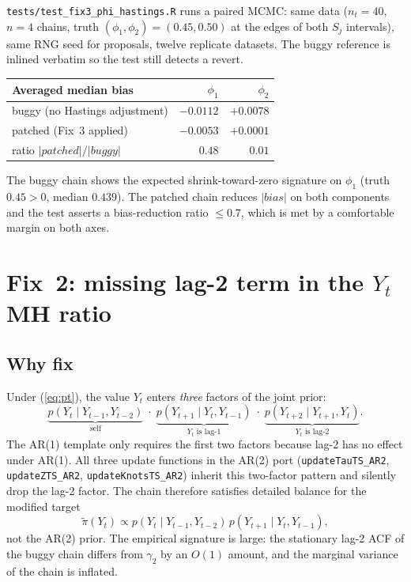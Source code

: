 \documentclass[11pt]{article}
\newcommand{\eref}[1]{(\ref{#1})}
\begin{document}
\texttt{tests/test\_fix3\_phi\_hastings.R} runs a paired MCMC: same data
($n_t = 40$, $n = 4$ chains, truth $(\phi_1, \phi_2) = (0.45, 0.50)$ at the
edges of both $S_j$ intervals), same RNG seed for proposals, twelve replicate
datasets. The buggy reference is inlined verbatim so the test still detects a
revert.
\begin{center}
\begin{tabular}{lrr}
\toprule
\textbf{Averaged median bias}     & $\phi_1$      & $\phi_2$      \\
\midrule
buggy   (no Hastings adjustment)  & $-0.0112$     & $+0.0078$     \\
patched (Fix~3 applied)           & $-0.0053$     & $+0.0001$     \\
ratio   $|patched|/|buggy|$       & $0.48$        & $0.01$        \\
\bottomrule
\end{tabular}
\end{center}
The buggy chain shows the expected shrink-toward-zero signature on $\phi_1$
(truth $0.45 > 0$, median $0.439$). The patched chain reduces $|bias|$ on both
components and the test asserts a bias-reduction ratio $\leq 0.7$, which is
met by a comfortable margin on both axes.

\section{Fix~2: missing lag-2 term in the $Y_t$ MH ratio}\label{ar2fix:fix2}

\subsection{Why fix}

Under \eref{eq:pt}, the value $Y_t$ enters \emph{three} factors of the joint
prior:
\[
  \underbrace{p(Y_t \mid Y_{t-1}, Y_{t-2})}_{\text{self}} \;\cdot\;
  \underbrace{p(Y_{t+1} \mid Y_t, Y_{t-1})}_{Y_t \text{ is lag-1}} \;\cdot\;
  \underbrace{p(Y_{t+2} \mid Y_{t+1}, Y_t)}_{Y_t \text{ is lag-2}}.
\]
The AR(1) template only requires the first two factors because lag-2 has no
effect under AR(1). All three update functions in the AR(2) port
(\texttt{updateTauTS\_AR2}, \texttt{updateZTS\_AR2},
\texttt{updateKnotsTS\_AR2}) inherit this two-factor pattern and silently drop
the lag-2 factor. The chain therefore satisfies detailed balance for the
modified target
\[
  \widetilde\pi(Y_t) \propto p(Y_t \mid Y_{t-1}, Y_{t-2})\, p(Y_{t+1} \mid Y_t, Y_{t-1}),
\]
not the AR(2) prior. The empirical signature is large: the stationary lag-2
ACF of the buggy chain differs from $\gamma_2$ by an $O(1)$ amount, and the
marginal variance of the chain is inflated.
\end{document}
